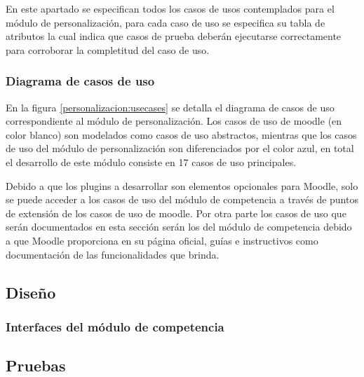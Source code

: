  En este apartado se especifican todos los casos de usos contemplados para el módulo de
 personalización, para cada caso de uso se especifica su tabla de atributos la cual indica que casos
 de prueba deberán ejecutarse correctamente para corroborar la completitud del caso de uso.

\subsubsection*{Diagrama de casos de uso}

 En la figura \ref{personalizacion:usecases} se detalla el diagrama de casos de uso correspondiente al módulo
 de personalización. Los casos de uso de moodle (en color blanco) son modelados como casos de uso
 abstractos, mientras que los casos de uso del módulo de personalización son diferenciados por el
 color azul, en total el desarrollo de este módulo consiste en 17 casos de uso principales.


 \noindent
 Debido a que los plugins a desarrollar son elementos opcionales para Moodle, solo se puede
 acceder a los casos de uso del módulo de competencia a través de puntos de extensión de los
 casos de uso de moodle. Por otra parte los casos de uso que serán documentados en esta sección
 serán los del módulo de competencia debido a que Moodle proporciona en su página oficial, guías
 e instructivos como documentación de las funcionalidades que brinda.



\clearpage
\subsection{Diseño}

\subsubsection{Interfaces del módulo de competencia}

    
    
    
    





\subsection{Pruebas}

